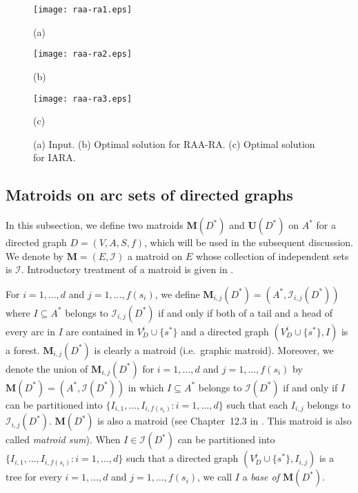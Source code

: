 \documentclass[11pt]{article}
\newcounter{ni}
\theoremstyle{plain}
\begin{document}
\begin{figure}[h]
\begin{minipage}{0.33\hsize}
\begin{center}
\texttt{[image: raa-ra1.eps]}
\par(a)
\end{center}
\end{minipage}
\begin{minipage}{0.32\hsize}
\begin{center}
\texttt{[image: raa-ra2.eps]}
\par(b)
\end{center}
\end{minipage}
\begin{minipage}{0.33\hsize}
\begin{center}
\texttt{[image: raa-ra3.eps]}
\par(c)
\end{center}
\end{minipage}
\caption{\small (a) Input.
(b) Optimal solution for $\mbox{RAA-RA}$. (c) Optimal solution for $\mbox{IARA}$.}
\label{example_raa-ra}
\end{figure}

\subsection{Matroids on arc sets of directed graphs}

In this subsection, 
we define two matroids $\bm{M}(D^{\ast})$ and $\bm{U}(D^{\ast})$ 
on $A^{\ast}$ for a directed graph $D=(V,A,S,f)$, 
which will be used in the subsequent discussion.
We denote by $\bm{M}=(E,\mathcal{I})$ a matroid on $E$ whose collection of independent sets is 
$\mathcal{I}$. Introductory treatment of a matroid is given in \cite{O92}. 

For $i=1,\ldots,d$ and $j=1,\ldots,f(s_i)$, 
we define $\bm{M}_{i,j}(D^{\ast})=(A^{\ast},\mathcal{I}_{i,j}(D^{\ast}))$ 
where $I \subseteq A^{\ast}$ belongs to $\mathcal{I}_{i,j}(D^{\ast})$ 
if and only if both of 
a tail and a head of every arc in $I$ are contained in $V^i_D \cup \{s^{\ast}\}$ and 
a directed graph $(V^i_D\cup \{s^{\ast}\}, I)$ is a forest. 
$\bm{M}_{i,j}(D^{\ast})$ is clearly a matroid (i.e.~graphic matroid). 
Moreover, we denote the union of $\bm{M}_{i,j}(D^{\ast})$ 
for $i=1,\ldots,d$ and $j=1,\ldots,f(s_i)$
by $\bm{M}(D^{\ast})=(A^{\ast},\mathcal{I}(D^{\ast}))$ 
in which $I \subseteq A^{\ast}$ belongs to $\mathcal{I}(D^{\ast})$
if and only if $I$ can be partitioned into $\{I_{i,1},\ldots,I_{i,f(s_i)}\colon i=1,\ldots,d\}$ 
such that each $I_{i,j}$ belongs to $\mathcal{I}_{i,j}(D^{\ast})$. 
$\bm{M}(D^{\ast})$ is also a matroid
(see Chapter~12.3 in \cite{O92}. This matroid is also called {\it matroid sum}).
When $I \in \mathcal{I}(D^{\ast})$ can be partitioned into $\{I_{i,1},\ldots,I_{i,f(s_i)}\colon i=1,\ldots,d\}$
such that a directed graph $(V^i_D\cup \{s^{\ast}\},I_{i,j})$ is a tree for 
every $i=1,\ldots,d$ and $j=1,\ldots,f(s_i)$, 
we call $I$ a {\it base of $\bm{M}(D^{\ast})$}. 
\end{document}
